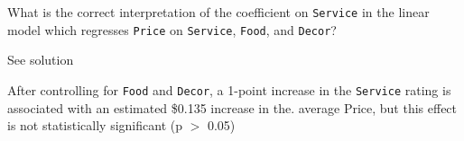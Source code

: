 \documentclass[
  letterpaper,
  DIV=11,
  numbers=noendperiod]{scrartcl}
\begin{document}
\begin{tcolorbox}[enhanced jigsaw, titlerule=0mm, colbacktitle=quarto-callout-warning-color!10!white, opacityback=0, left=2mm, rightrule=.15mm, toptitle=1mm, opacitybacktitle=0.6, colback=white, coltitle=black, breakable, bottomrule=.15mm, arc=.35mm, bottomtitle=1mm, title={Task 9}, toprule=.15mm, leftrule=.75mm, colframe=quarto-callout-warning-color-frame]

What is the correct interpretation of the coefficient on
\texttt{Service} in the linear model which regresses \texttt{Price} on
\texttt{Service}, \texttt{Food}, and \texttt{Decor}?

See solution

After controlling for \texttt{Food} and \texttt{Decor}, a 1-point
increase in the \texttt{Service} rating is associated with an estimated
\$0.135 increase in the. average Price, but this effect is not
statistically significant (p \(>\) 0.05)

\end{tcolorbox}
\end{document}
